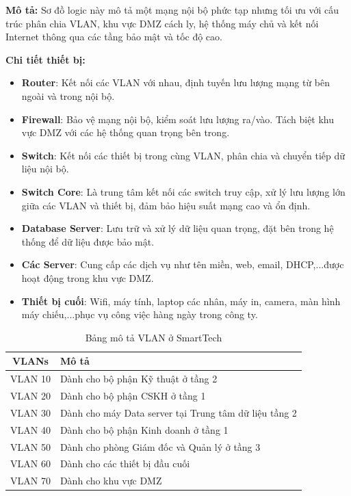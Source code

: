 \textbf{Mô tả:} Sơ đồ logic này mô tả một mạng nội bộ phức tạp nhưng tối ưu với cấu trúc phân chia VLAN, khu vực DMZ cách ly, hệ thống máy chủ và kết nối Internet thông qua các tầng bảo mật và tốc độ cao.

\textbf{Chi tiết thiết bị:}
\begin{itemize}[left=2cm]
    \item \textbf{Router}: Kết nối các VLAN với nhau, định tuyến lưu lượng mạng từ bên ngoài và trong nội bộ.
    \item \textbf{Firewall}: Bảo vệ mạng nội bộ, kiểm soát lưu lượng ra/vào. Tách biệt khu vực DMZ với các hệ thống quan trọng bên trong.
    \item \textbf{Switch}: Kết nối các thiết bị trong cùng VLAN, phân chia và chuyển tiếp dữ liệu nội bộ.
    \item \textbf{Switch Core}: Là trung tâm kết nối các switch truy cập, xử lý lưu lượng lớn giữa các VLAN và thiết bị, đảm bảo hiệu suất mạng cao và ổn định.
    \item \textbf{Database Server}: Lưu trữ và xử lý dữ liệu quan trọng, đặt bên trong hệ thống để dữ liệu được bảo mật.
    \item \textbf{Các Server}: Cung cấp các dịch vụ như tên miền, web, email, DHCP,...được hoạt động trong khu vực DMZ.
    \item \textbf{Thiết bị cuối}: Wifi, máy tính, laptop các nhân, máy in, camera, màn hình máy chiếu,...phục vụ công việc hàng ngày trong công ty.
\end{itemize}

\begin{table}[htbp]
\centering
\begin{tabular}{|c|l|}
\hline
\textbf{VLANs }& \textbf{Mô tả} \\
\hline
VLAN 10 & Dành cho bộ phận Kỹ thuật ở tầng 2 \\
\hline
VLAN 20 & Dành cho bộ phận CSKH ở tầng 1 \\
\hline
VLAN 30 & Dành cho máy Data server tại Trung tâm dữ liệu tầng 2\\
\hline
VLAN 40 & Dành cho bộ phận Kinh doanh ở tầng 1 \\
\hline
VLAN 50 & Dành cho phòng Giám đốc và Quản lý ở tầng 3 \\
\hline
VLAN 60 & Dành cho các thiết bị đầu cuối \\
\hline
VLAN 70 & Dành cho khu vực DMZ \\
\hline
\end{tabular}
\caption{Bảng mô tả VLAN ở SmartTech}
\end{table}

